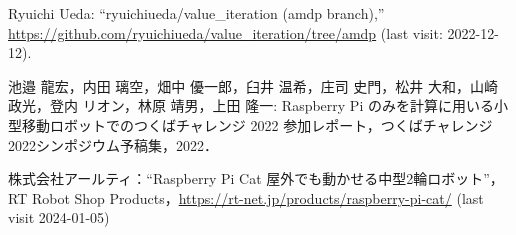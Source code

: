 \documentclass[twocolumn,9pt]{jsproceedings}
\begin{document}
\begin{thebibliography}{99}
  Ryuichi Ueda: ``ryuichiueda/value\_iteration (amdp branch),''\\\url{https://github.com/ryuichiueda/value_iteration/tree/amdp} (last visit: 2022-12-12).





  池邉 龍宏，内田 璃空，畑中 優一郎，臼井 温希，庄司 史門，松井 大和，山崎 政光，登内 リオン，林原 靖男，上田 隆一: Raspberry Pi のみを計算に用いる小型移動ロボットでのつくばチャレンジ 2022 参加レポート，つくばチャレンジ2022シンポジウム予稿集，2022．




  株式会社アールティ：``Raspberry Pi Cat 屋外でも動かせる中型2輪ロボット''，
  RT Robot Shop Products，\url{https://rt-net.jp/products/raspberry-pi-cat/} (last visit 2024-01-05)




\end{thebibliography}
\end{document}
